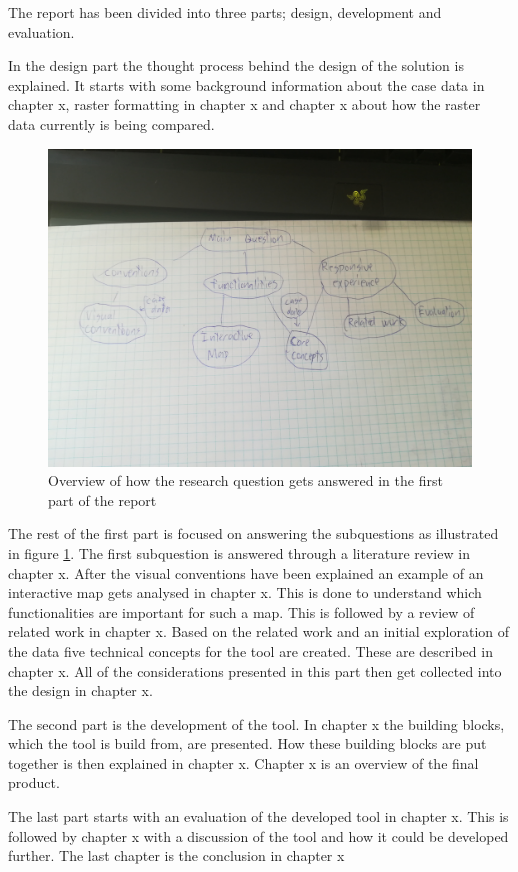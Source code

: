 %
%

The report has been divided into three parts; design, development and evaluation.




In the design part the thought process behind the design of the solution is explained.
It starts with some background information about the case data in chapter x, raster formatting in chapter x and chapter x about how the raster data currently is being compared. 
\begin{figure} [H]
	\centering
	\includegraphics[width=.8\textwidth]{Pictures/Structure}
	\caption{Overview of how the research question gets answered in the first part of the report}
	\label{Structure}
\end{figure}

The rest of the first part is focused on answering the subquestions as illustrated in figure \ref{Structure}. 
The first subquestion is answered through a literature review in chapter x. After the visual conventions have been explained an example of an interactive map gets analysed in chapter x. This is done to understand which functionalities are important for such a map. This is followed by a review of related work in chapter x. Based on the related work and an initial exploration of the data five technical concepts for the tool are created. These are described in chapter x. All of the considerations presented in this part then get collected into the design in chapter x. 

The second part is the development of the tool. In chapter x the building blocks, which the tool is build from, are presented. How these building blocks are put together is then explained in chapter x. Chapter x is an overview of the final product.


The last part starts with an evaluation of the developed tool in chapter x. This is followed by chapter x with a discussion of the tool and how it could be developed further. The last chapter is the conclusion in chapter x 

